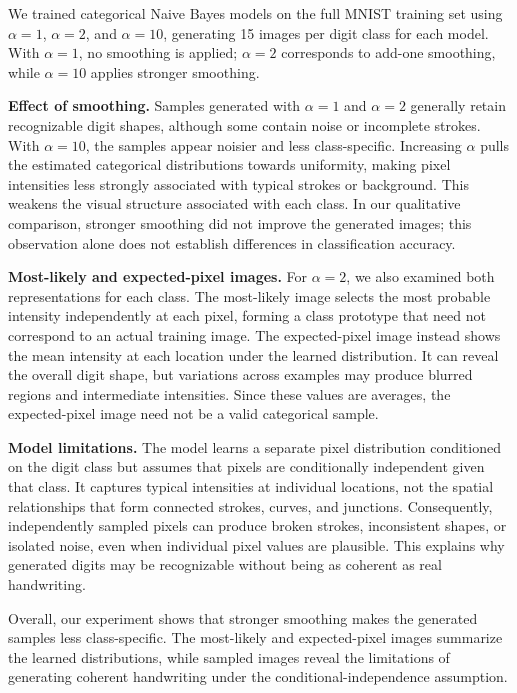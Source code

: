 \documentclass[a4paper,oneside,bibliography=totoc]{scrartcl}
\begin{document}
\begin{answer}[19cm]
We trained categorical Naive Bayes models on the full MNIST training set using $\alpha=1$, $\alpha=2$, and $\alpha=10$, generating 15 images per digit class for each model. With $\alpha=1$, no smoothing is applied; $\alpha=2$ corresponds to add-one smoothing, while $\alpha=10$ applies stronger smoothing.

\textbf{Effect of smoothing.} Samples generated with $\alpha=1$ and $\alpha=2$ generally retain recognizable digit shapes, although some contain noise or incomplete strokes. With $\alpha=10$, the samples appear noisier and less class-specific. Increasing $\alpha$ pulls the estimated categorical distributions towards uniformity, making pixel intensities less strongly associated with typical strokes or background. This weakens the visual structure associated with each class. In our qualitative comparison, stronger smoothing did not improve the generated images; this observation alone does not establish differences in classification accuracy.

\textbf{Most-likely and expected-pixel images.} For $\alpha=2$, we also examined both representations for each class. The most-likely image selects the most probable intensity independently at each pixel, forming a class prototype that need not correspond to an actual training image. The expected-pixel image instead shows the mean intensity at each location under the learned distribution. It can reveal the overall digit shape, but variations across examples may produce blurred regions and intermediate intensities. Since these values are averages, the expected-pixel image need not be a valid categorical sample.

\textbf{Model limitations.} The model learns a separate pixel distribution conditioned on the digit class but assumes that pixels are conditionally independent given that class. It captures typical intensities at individual locations, not the spatial relationships that form connected strokes, curves, and junctions. Consequently, independently sampled pixels can produce broken strokes, inconsistent shapes, or isolated noise, even when individual pixel values are plausible. This explains why generated digits may be recognizable without being as coherent as real handwriting.

Overall, our experiment shows that stronger smoothing makes the generated samples less class-specific. The most-likely and expected-pixel images summarize the learned distributions, while sampled images reveal the limitations of generating coherent handwriting under the conditional-independence assumption.
\end{answer}
\end{document}
